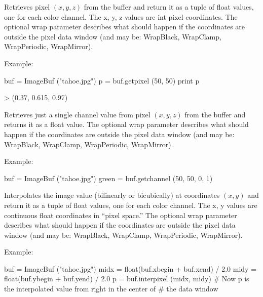 Retrieves pixel $(x,y,z)$ from the buffer and return it as a tuple of
{\cf float} values, one for each color channel.  The {\cf x, y, z} values
are {\cf int} pixel coordinates.  The optional {\cf wrap} parameter
describes what should happen if the coordinates are outside the pixel data
window (and may be: {\cf WrapBlack, WrapClamp, WrapPeriodic, WrapMirror}).

\noindent Example:
\begin{code}
    buf = ImageBuf ("tahoe.jpg")
    p = buf.getpixel (50, 50)
    print p

    > (0.37, 0.615, 0.97)
\end{code}
\apiend

Retrieves just a single channel value from pixel $(x,y,z)$ from the buffer
and returns it as a {\cf float} value.  The optional {\cf wrap} parameter
describes what should happen if the coordinates are outside the pixel data
window (and may be: {\cf WrapBlack, WrapClamp, WrapPeriodic, WrapMirror}).

\noindent Example:
\begin{code}
    buf = ImageBuf ("tahoe.jpg")
    green = buf.getchannel (50, 50, 0, 1)
\end{code}
\apiend

Interpolates the image value (bilinearly or bicubically)
at coordinates $(x,y)$ and return it as a tuple
of {\cf float} values, one for each color channel.  The {\cf x, y} values
are continuous {\cf float} coordinates in ``pixel space.''   The optional
{\cf wrap} parameter describes what should happen if the coordinates are
outside the pixel data window (and may be: {\cf WrapBlack, WrapClamp,
WrapPeriodic, WrapMirror}).

\noindent Example:
\begin{code}
    buf = ImageBuf ("tahoe.jpg")
    midx = float(buf.xbegin + buf.xend) / 2.0
    midy = float(buf.ybegin + buf.yend) / 2.0
    p = buf.interpixel (midx, midy)
    # Now p is the interpolated value from right in the center of
    # the data window
\end{code}
\apiend


